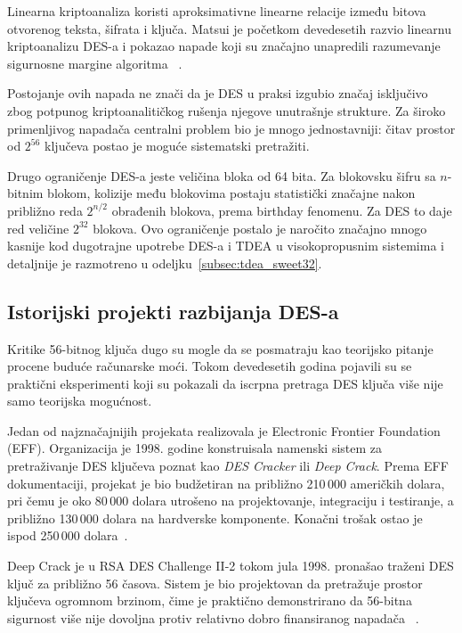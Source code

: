 Linearna kriptoanaliza koristi aproksimativne linearne relacije između
bitova otvorenog teksta, šifrata i ključa. Matsui je početkom
devedesetih razvio linearnu kriptoanalizu DES-a i pokazao napade koji
su značajno unapredili razumevanje sigurnosne margine algoritma
~\cite{matsui-linear-des-1993}.

Postojanje ovih napada ne znači da je DES u praksi izgubio značaj
isključivo zbog potpunog kriptoanalitičkog rušenja njegove unutrašnje
strukture. Za široko primenljivog napadača centralni problem bio je
mnogo jednostavniji: čitav prostor od $2^{56}$ ključeva postao je
moguće sistematski pretražiti.

Drugo ograničenje DES-a jeste veličina bloka od 64 bita. Za
blokovsku šifru sa $n$-bitnim blokom, kolizije među blokovima postaju
statistički značajne nakon približno reda
$2^{n/2}$
obrađenih blokova, prema birthday fenomenu. Za DES to daje red
veličine
$2^{32}$
blokova. Ovo ograničenje postalo je naročito značajno mnogo kasnije
kod dugotrajne upotrebe DES-a i TDEA u visokopropusnim
sistemima i detaljnije je razmotreno u odeljku~\ref{subsec:tdea_sweet32}.


\subsection{Istorijski projekti razbijanja DES-a}
\label{subsec:des_cracking_projects}

Kritike 56-bitnog ključa dugo su mogle da se posmatraju kao
teorijsko pitanje procene buduće računarske moći. Tokom devedesetih
godina pojavili su se praktični eksperimenti koji su pokazali da
iscrpna pretraga DES ključa više nije samo teorijska mogućnost.

Jedan od najznačajnijih projekata realizovala je Electronic Frontier
Foundation (EFF). Organizacija je 1998. godine konstruisala namenski
sistem za pretraživanje DES ključeva poznat kao \emph{DES Cracker} ili
\emph{Deep Crack}. Prema EFF dokumentaciji, projekat je bio budžetiran
na približno 210\,000 američkih dolara, pri čemu je oko 80\,000 dolara
utrošeno na projektovanje, integraciju i testiranje, a približno
130\,000 dolara na hardverske komponente. Konačni trošak ostao je
ispod 250\,000 dolara~\cite{eff-des-cracker-1998}.

Deep Crack je u RSA DES Challenge II-2 tokom jula 1998. pronašao
traženi DES ključ za približno 56 časova. Sistem je bio projektovan
da pretražuje prostor ključeva ogromnom brzinom, čime je praktično
demonstrirano da 56-bitna sigurnost više nije dovoljna protiv
relativno dobro finansiranog napadača
~\cite{eff-des-cracker-1998}.

